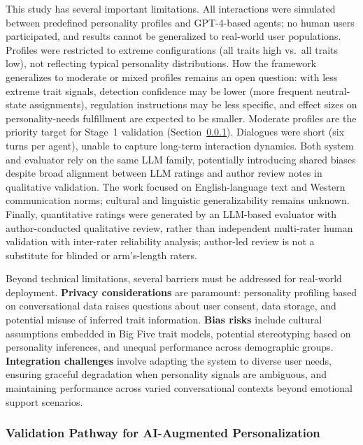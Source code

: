 \documentclass[apajournal,article,submit,moreauthors]{Definitions/mdpi}
\begin{document}
This study has several important limitations. All interactions were simulated between predefined personality profiles and GPT-4-based agents; no human users participated, and results cannot be generalized to real-world user populations. Profiles were restricted to extreme configurations (all traits high vs.~all traits low), not reflecting typical personality distributions. How the framework generalizes to moderate or mixed profiles remains an open question: with less extreme trait signals, detection confidence may be lower (more frequent neutral-state assignments), regulation instructions may be less specific, and effect sizes on personality-needs fulfillment are expected to be smaller. Moderate profiles are the priority target for Stage~1 validation (Section~\ref{validation-pathway-for-ai-augmented-personalization}). Dialogues were short (six turns per agent), unable to capture long-term interaction dynamics. Both system and evaluator rely on the same LLM family, potentially introducing shared biases despite broad alignment between LLM ratings and author review notes in qualitative validation. The work focused on English-language text and Western communication norms; cultural and linguistic generalizability remains unknown. Finally, quantitative ratings were generated by an LLM-based evaluator with author-conducted qualitative review, rather than independent multi-rater human validation with inter-rater reliability analysis; author-led review is not a substitute for blinded or arm's-length raters.

Beyond technical limitations, several barriers must be addressed for real-world deployment. \textbf{Privacy considerations} are paramount: personality profiling based on conversational data raises questions about user consent, data storage, and potential misuse of inferred trait information. \textbf{Bias risks} include cultural assumptions embedded in Big Five trait models, potential stereotyping based on personality inferences, and unequal performance across demographic groups. \textbf{Integration challenges} involve adapting the system to diverse user needs, ensuring graceful degradation when personality signals are ambiguous, and maintaining performance across varied conversational contexts beyond emotional support scenarios.

\subsubsection{Validation Pathway for AI-Augmented Personalization}\label{validation-pathway-for-ai-augmented-personalization}
\end{document}
